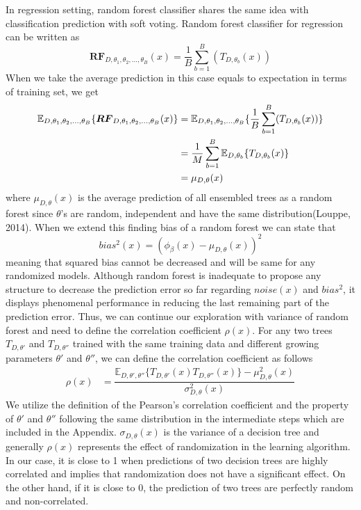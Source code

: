 In regression setting, random forest classifier shares the same idea with classification prediction with soft voting. Random forest classifier for regression can be written as
\begin{equation}
\boldsymbol{RF}_{D, \theta_{1},\theta_{2},..., \theta_{B}}(x) = \dfrac{1}{B}\sum_{b = 1}^{B}(T_{D,\theta_{b}}(x))
\end{equation}
When we take the average prediction in this case equals to expectation in terms of training set, we get
\begin{align}
\mathbb{E}_{D, \theta_{1}, \theta_{2},..., \theta_{B}}\{\boldsymbol{RF}_{D, \theta_{1},\theta_{2},..., \theta_{B}}(x) \} & = 
	\mathbb{E}_{D, \theta_{1}, \theta_{2},..., \theta_{B}}\{\dfrac{1}{B}\sum_{b = 1}^{B}(T_{D,\theta_{b}}(x))\} \notag \\
	& = \dfrac{1}{M}\sum_{b=1}^{B}\mathbb{E}_{D,\theta_{b}}\{T_{D, \theta_{b}}(x)\}\notag \\
	& = \mu_{D,\theta}(x)
\end{align}
where $\mu_{D,\theta}(x)$ is the average prediction of all ensembled trees as a random forest since $\theta$'s are random, independent
and have the same distribution(Louppe, 2014). When we extend this finding bias of a random forest we can state that 
\begin{equation}
bias^2(x) = (\phi_{\beta}(x) - \mu_{D,\theta}(x))^2
\end{equation}
meaning that squared bias cannot be decreased and will be same for any randomized models. Although random forest is inadequate to propose any structure to decrease the prediction error so far regarding $noise(x)$ and $bias^2$, it displays phenomenal performance in reducing the last remaining part of the prediction error. Thus, we can continue our exploration with variance of random forest and need to define the correlation coefficient $\rho(x)$. For any two trees $T_{D,\theta'}$ and $T_{D,\theta''}$ trained with the same training data and different growing parameters $\theta'$ and $\theta''$, we can define the correlation coefficient as follows
\begin{align}
\rho(x) & = \dfrac{\mathbb{E}_{D,\theta',\theta''}\{T_{D,\theta'}(x) T_{D,\theta''}(x)\} - \mu_{D,\theta}^2(x)}{\sigma_{D,\theta}^2(x)}
\end{align}
We utilize the definition of the Pearson's correlation coefficient and the property of $\theta'$ and $\theta''$ following the same distribution in the intermediate steps which are included in the Appendix. $\sigma_{D, \theta}(x)$ is the variance of a decision tree and generally $\rho(x)$ represents the effect of randomization in the learning algorithm. In our case, it is close to 1 when predictions of two decision trees are highly correlated and implies that randomization does not have a significant effect. On the other hand, if it is close to 0, the prediction of two trees are perfectly random and non-correlated.

